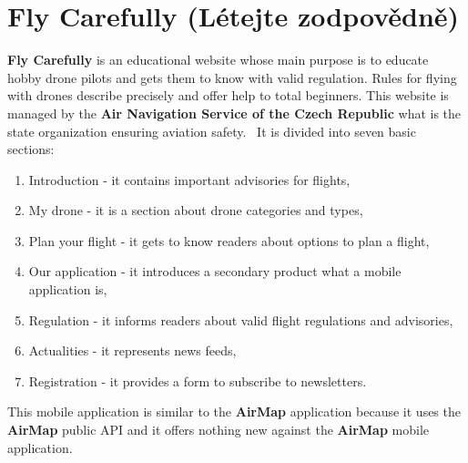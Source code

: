 \section{Fly Carefully (L{\' e}tejte zodpov{\v e}dn{\v e})}\label{sec:fly-carefully}
\textbf{Fly Carefully} is an educational website whose main purpose is to educate hobby drone pilots and gets them to know with valid regulation.
Rules for flying with drones describe precisely and offer help to total beginners.
This website is managed by the \textbf{Air Navigation Service of the Czech Republic} what is the state organization ensuring aviation safety.~\cite{flyCarefully}
It is divided into seven basic sections:
\begin{enumerate}
    \item Introduction - it contains important advisories for flights,
    \item My drone - it is a section about drone categories and types,
    \item Plan your flight - it gets to know readers about options to plan a flight,
    \item Our application - it introduces a secondary product what a mobile application is,
    \item Regulation - it informs readers about valid flight regulations and advisories,
    \item Actualities - it represents news feeds,
    \item Registration - it provides a form to subscribe to newsletters.
\end{enumerate}
This mobile application is similar to the \textbf{AirMap} application because it uses the \textbf{AirMap} public API and it offers nothing new against the \textbf{AirMap} mobile application.
